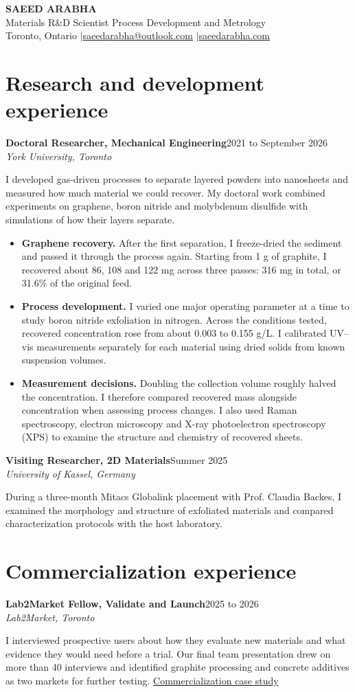 \documentclass[11pt,letterpaper]{article}
\newcommand{\role}[3]{\textbf{#1}\hfill #2\\\textit{\color{mygray}#3}\par}
\begin{document}
\begin{center}
{\LARGE\bfseries\color{myblue} SAEED ARABHA}\\[4pt]
{\large Materials R\&D Scientist \textbar{} Process Development and Metrology}\\[4pt]
Toronto, Ontario \enspace$\vert$\enspace \href{mailto:saeedarabha@outlook.com}{saeedarabha@outlook.com} \enspace$\vert$\enspace \href{https://www.saeedarabha.com}{saeedarabha.com}
\end{center}
\section*{Research and development experience}
\role{Doctoral Researcher, Mechanical Engineering}{2021 to September 2026}{York University, Toronto}
I developed gas-driven processes to separate layered powders into nanosheets and measured how much material we could recover. My doctoral work combined experiments on graphene, boron nitride and molybdenum disulfide with simulations of how their layers separate.
\begin{itemize}
\item \textbf{Graphene recovery.} After the first separation, I freeze-dried the sediment and passed it through the process again. Starting from 1 g of graphite, I recovered about 86, 108 and 122 mg across three passes: 316 mg in total, or 31.6\% of the original feed.
\item \textbf{Process development.} I varied one major operating parameter at a time to study boron nitride exfoliation in nitrogen. Across the conditions tested, recovered concentration rose from about 0.003 to 0.155 g/L. I calibrated UV--vis measurements separately for each material using dried solids from known suspension volumes.
\item \textbf{Measurement decisions.} Doubling the collection volume roughly halved the concentration. I therefore compared recovered mass alongside concentration when assessing process changes. I also used Raman spectroscopy, electron microscopy and X-ray photoelectron spectroscopy (XPS) to examine the structure and chemistry of recovered sheets.
\end{itemize}
\medskip
\role{Visiting Researcher, 2D Materials}{Summer 2025}{University of Kassel, Germany}
During a three-month Mitacs Globalink placement with Prof. Claudia Backes, I examined the morphology and structure of exfoliated materials and compared characterization protocols with the host laboratory.
\section*{Commercialization experience}
\role{Lab2Market Fellow, Validate and Launch}{2025 to 2026}{Lab2Market, Toronto}
I interviewed prospective users about how they evaluate new materials and what evidence they would need before a trial. Our final team presentation drew on more than 40 interviews and identified graphite processing and concrete additives as two markets for further testing. \href{https://www.saeedarabha.com/venture}{Commercialization case study}
\end{document}
